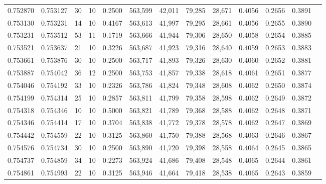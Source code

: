 \begin{tabular}{rrrrrrrrrrrrr}
0.752870 & 0.753127 &    30 &  10 &                                     0.2500 & 563,599 &  42,011 &  79,285 &  28,671 & 0.4056 & 0.2656 & 0.3891 \\
0.753130 & 0.753231 &    14 &  10 &                                     0.4167 & 563,613 &  41,997 &  79,295 &  28,661 & 0.4056 & 0.2655 & 0.3890 \\
0.753231 & 0.753512 &    53 &  11 &                                     0.1719 & 563,666 &  41,944 &  79,306 &  28,650 & 0.4058 & 0.2654 & 0.3885 \\
0.753521 & 0.753637 &    21 &  10 &                                     0.3226 & 563,687 &  41,923 &  79,316 &  28,640 & 0.4059 & 0.2653 & 0.3883 \\
0.753661 & 0.753876 &    30 &  10 &                                     0.2500 & 563,717 &  41,893 &  79,326 &  28,630 & 0.4060 & 0.2652 & 0.3881 \\
0.753887 & 0.754042 &    36 &  12 &                                     0.2500 & 563,753 &  41,857 &  79,338 &  28,618 & 0.4061 & 0.2651 & 0.3877 \\
0.754046 & 0.754192 &    33 &  10 &                                     0.2326 & 563,786 &  41,824 &  79,348 &  28,608 & 0.4062 & 0.2650 & 0.3874 \\
0.754199 & 0.754314 &    25 &  10 &                                     0.2857 & 563,811 &  41,799 &  79,358 &  28,598 & 0.4062 & 0.2649 & 0.3872 \\
0.754318 & 0.754346 &    10 &  10 &                                     0.5000 & 563,821 &  41,789 &  79,368 &  28,588 & 0.4062 & 0.2648 & 0.3871 \\
0.754346 & 0.754414 &    17 &  10 &                                     0.3704 & 563,838 &  41,772 &  79,378 &  28,578 & 0.4062 & 0.2647 & 0.3869 \\
0.754442 & 0.754559 &    22 &  10 &                                     0.3125 & 563,860 &  41,750 &  79,388 &  28,568 & 0.4063 & 0.2646 & 0.3867 \\
0.754576 & 0.754734 &    30 &  10 &                                     0.2500 & 563,890 &  41,720 &  79,398 &  28,558 & 0.4064 & 0.2645 & 0.3865 \\
0.754737 & 0.754859 &    34 &  10 &                                     0.2273 & 563,924 &  41,686 &  79,408 &  28,548 & 0.4065 & 0.2644 & 0.3861 \\
0.754861 & 0.754993 &    22 &  10 &                                     0.3125 & 563,946 &  41,664 &  79,418 &  28,538 & 0.4065 & 0.2643 & 0.3859 \\

\end{tabular}
